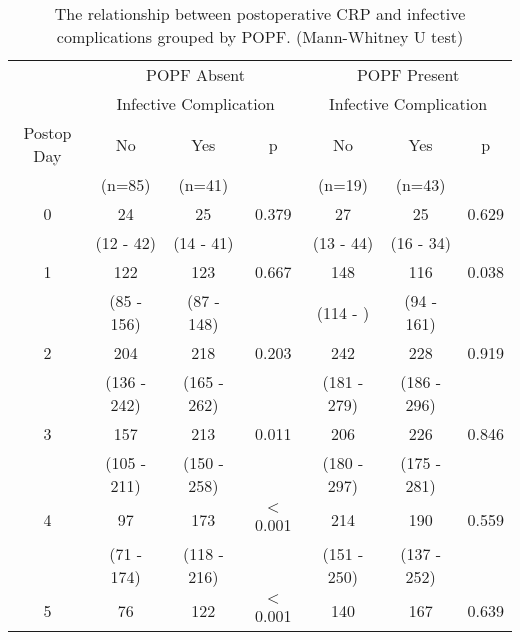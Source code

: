 \begin{table}[h]
	\centering
	\caption{The relationship between postoperative CRP and infective complications grouped by POPF. (Mann-Whitney U test)}
	\label{table:crp_comp_vs_infections_popf_y1n0}
	\begin{tabular}{| c | c c c | c c c |}
		\hline
		           &       \multicolumn{3}{c|}{POPF Absent}       &      \multicolumn{3}{c|}{POPF Present}       \\
		           & \multicolumn{3}{c|}{Infective Complication} & \multicolumn{3}{c|}{Infective Complication} \\
		Postop Day & No          & Yes         & p                & No          & Yes         & p                \\
		           & (n=85)      & (n=41)      &                  & (n=19)      & (n=43)      &  \\ \hline
		0          & 24          & 25          & 0.379            & 27          & 25          & 0.629            \\
		           & (12 - 42)   & (14 - 41)   &                  & (13 - 44)   & (16 - 34)   &  \\
		1          & 122         & 123         & 0.667            & 148         & 116         & 0.038            \\
		           & (85 - 156)  & (87 - 148)  &                  & (114 - )    & (94 - 161)  &  \\
		2          & 204         & 218         & 0.203            & 242         & 228         & 0.919            \\
		           & (136 - 242) & (165 - 262) &                  & (181 - 279) & (186 - 296) &  \\
		3          & 157         & 213         & 0.011            & 206         & 226         & 0.846            \\
		           & (105 - 211) & (150 - 258) &                  & (180 - 297) & (175 - 281) &  \\
		4          & 97          & 173         & $<$0.001         & 214         & 190         & 0.559            \\
		           & (71 - 174)  & (118 - 216) &                  & (151 - 250) & (137 - 252) &  \\
		5          & 76          & 122         & $<$0.001         & 140         & 167         & 0.639            \\

\end{tabular}
\end{table}
